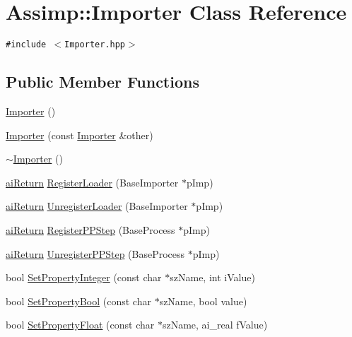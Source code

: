 \hypertarget{class_assimp_1_1_importer}{
\section{Assimp::Importer Class Reference}
\label{class_assimp_1_1_importer}
}
{\tt \#include $<$Importer.hpp$>$}

\subsection*{Public Member Functions}
\begin{CompactItemize}
\item 
\hyperlink{class_assimp_1_1_importer_2c207299ed05f1db1ad1e6dab005f719}{Importer} ()
\item 
\hyperlink{class_assimp_1_1_importer_69743664b5a7a8c195be48265144317b}{Importer} (const \hyperlink{class_assimp_1_1_importer}{Importer} \&other)
\item 
\hyperlink{class_assimp_1_1_importer_3d65af5286ba22f46220a72a6eb2a1c9}{$\sim$Importer} ()
\item 
\hyperlink{types_8h_1f78dfb65090aa930cabb984c8abe711}{aiReturn} \hyperlink{class_assimp_1_1_importer_3846294ffe76d91a1d3096d22d7c6b7d}{RegisterLoader} (BaseImporter $\ast$pImp)
\item 
\hyperlink{types_8h_1f78dfb65090aa930cabb984c8abe711}{aiReturn} \hyperlink{class_assimp_1_1_importer_3b1f5af2c763b13aca0f324b19001722}{UnregisterLoader} (BaseImporter $\ast$pImp)
\item 
\hyperlink{types_8h_1f78dfb65090aa930cabb984c8abe711}{aiReturn} \hyperlink{class_assimp_1_1_importer_102650d3648c0e414a1e73bdad9bed35}{RegisterPPStep} (BaseProcess $\ast$pImp)
\item 
\hyperlink{types_8h_1f78dfb65090aa930cabb984c8abe711}{aiReturn} \hyperlink{class_assimp_1_1_importer_3a683671c7c40638b1103c5d3648d86c}{UnregisterPPStep} (BaseProcess $\ast$pImp)
\item 
bool \hyperlink{class_assimp_1_1_importer_2542eed3d5f491025c4095b4e55fa068}{SetPropertyInteger} (const char $\ast$szName, int iValue)
\item 
bool \hyperlink{class_assimp_1_1_importer_4af22a88eddf464d949a761149c72825}{SetPropertyBool} (const char $\ast$szName, bool value)
\item 
bool \hyperlink{class_assimp_1_1_importer_d38af78d6fe4b1f132d2534d8a84deea}{SetPropertyFloat} (const char $\ast$szName, ai\_\-real fValue)
\item 

\end{CompactItemize}
